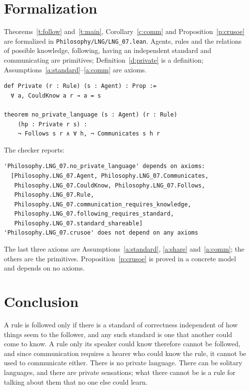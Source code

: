 \documentclass{situationist-preprint}
\begin{document}
\section{Formalization}

Theorems~\ref{t:follow} and~\ref{t:main}, Corollary~\ref{c:comm} and Proposition~\ref{p:crusoe} are formalized in \nolinkurl{Philosophy/LNG/LNG_07.lean}. Agents, rules and the relations of possible knowledge, following, having an independent standard and communicating are primitives; Definition~\ref{d:private} is a definition; Assumptions~\ref{a:standard}--\ref{a:comm} are axioms.

\begin{lstlisting}
def Private (r : Rule) (s : Agent) : Prop :=
  ∀ a, CouldKnow a r → a = s

theorem no_private_language (s : Agent) (r : Rule)
    (hp : Private r s) :
    ¬ Follows s r ∧ ∀ h, ¬ Communicates s h r
\end{lstlisting}

The checker reports:

\begin{lstlisting}
'Philosophy.LNG_07.no_private_language' depends on axioms:
  [Philosophy.LNG_07.Agent, Philosophy.LNG_07.Communicates,
   Philosophy.LNG_07.CouldKnow, Philosophy.LNG_07.Follows,
   Philosophy.LNG_07.Rule,
   Philosophy.LNG_07.communication_requires_knowledge,
   Philosophy.LNG_07.following_requires_standard,
   Philosophy.LNG_07.standard_shareable]
'Philosophy.LNG_07.crusoe' does not depend on any axioms
\end{lstlisting}

The last three axioms are Assumptions~\ref{a:standard}, \ref{a:share} and~\ref{a:comm}; the others are the primitives. Proposition~\ref{p:crusoe} is proved in a concrete model and depends on no axioms.

\section{Conclusion}

A rule is followed only if there is a standard of correctness independent of how things seem to the follower, and any such standard is one that another could come to know. A rule only its speaker could know therefore cannot be followed, and since communication requires a hearer who could know the rule, it cannot be used to communicate either. There is no private language. There can be solitary languages, and there are private sensations; what there cannot be is a rule for talking about them that no one else could learn.
\end{document}
